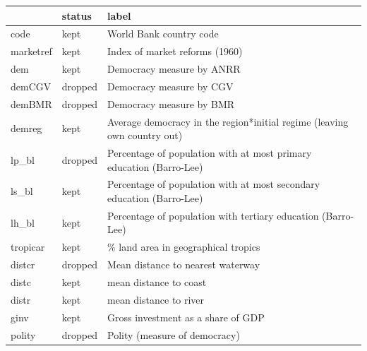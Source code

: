 \begin{tabular}{lll}
\toprule
                                & status   & label                                                                    \\
\midrule
 code                           & kept     & World Bank country code                                                  \\
 marketref                      & kept     & Index of market reforms (1960)                                           \\
 dem                            & kept     & Democracy measure by ANRR                                                \\
 demCGV                         & dropped  & Democracy measure by CGV                                                 \\
 demBMR                         & dropped  & Democracy measure by BMR                                                 \\
 demreg                         & kept     & Average democracy in the region*initial regime (leaving own country out) \\
 lp\_bl                          & dropped  & Percentage of population with at most primary education (Barro-Lee)      \\
 ls\_bl                          & kept     & Percentage of population with at most secondary education (Barro-Lee)    \\
 lh\_bl                          & kept     & Percentage of population with tertiary education (Barro-Lee)             \\
 tropicar                       & kept     & \% land area in geographical tropics                                      \\
 distcr                         & dropped  & Mean distance to nearest waterway                                        \\
 distc                          & kept     & mean distance to coast                                                   \\
 distr                          & kept     & mean distance to river                                                   \\
 ginv                           & kept     & Gross investment as a share of GDP                                       \\
 polity                         & dropped  & Polity (measure of democracy)                                            \\

\end{tabular}
